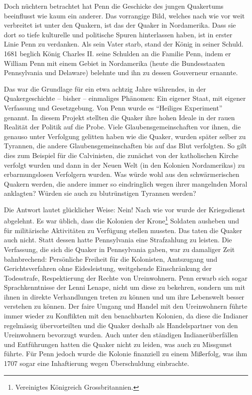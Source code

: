 \medskip

Doch nüchtern betrachtet hat Penn die Geschicke des jungen Quakertums
beeinflusst wie kaum ein anderer. Das vorrangige Bild, welches nach wie vor weit
verbreitet ist unter den Quakern, ist das der Quaker in Nordamerika. Dass sie
dort so tiefe kulturelle und politische Spuren hinterlassen haben, ist in erster
Linie Penn zu verdanken. Als sein Vater starb, stand der König in seiner Schuld.
1681 beglich König Charles II.  seine
Schulden an die Familie Penn, indem er William Penn mit einem
Gebiet in Nordamerika (heute die Bundesstaaten Pennsylvania und Delaware) belehnte und ihn
zu dessen Gouverneur ernannte.

\medskip

Das war die Grundlage für ein etwa achtzig Jahre währendes, in der Quakergeschichte
-- bisher -- einmaliges Phänomen: Ein eigener Staat, mit eigener Verfassung und
Gesetzgebung. Von Penn wurde es "`Heiliges Experiment"' genannt. In diesem Projekt
stellten die Quaker ihre hohen Ideale in der rauen Realität der Politik auf die
Probe. Viele Glaubensgemeinschaften vor ihnen, die genauso unter Verfolgung
gelitten haben wie die Quaker, wurden später selber zu Tyrannen, die andere
Glaubensgemeinschaften bis auf das Blut verfolgten. So gilt dies zum Beispiel für die
Calvinisten, die zunächst von der katholischen
Kirche verfolgt wurden und dann in der Neuen Welt (in den Kolonien
Nordamerikas) zu erbarmungslosen Verfolgern wurden. Was würde wohl aus den
schwärmerischen Quakern werden, die andere immer so eindringlich wegen ihrer
mangelnden Moral anklagten? Würden sie auch zu blutrünstigen Tyrannen werden?

\medskip

Die Antwort lautet glücklicher Weise: Nein! Nach wie vor wurde der Kriegsdienst
abgelehnt. Es war üblich, dass die Kolonien der Krone\footnote{Vereinigtes
Königreich Grossbritannien.} Soldaten ausheben und für militärische
Aktivitäten zu Verfügung stellen mussten. Das taten die Quaker auch nicht. Statt
dessen hatte Pennsylvania eine Strafzahlung zu leisten. Die Verfassung, die sich
die Quaker in Pennsylvania gaben, war zu damaliger Zeit bahnbrechend: Persönliche
Freiheit für die Kolonisten, Amtszugang und Gerichtsverfahren ohne
Eidesleistung, weitgehende Einschränkung der Todesstrafe, Respektierung der Rechte von Ureinwohnern. Penn erwarb sich sogar Sprachkenntnisse der Lenni Lenape, nicht
um diese zu bekehren, sondern um mit ihnen in direkte Verhandlungen treten zu
können und um ihre Lebenswelt besser verstehen zu können. Der faire Umgang und
Handel mit den Ureinwohnern führte immer wieder zu Konflikten mit den
benachbarten Kolonien, da diese die Indianer regelmässig übervorteilten und
die Quaker deshalb als Handelspartner von den Ureinwohnern bevorzugt wurden.
Auch unter den ständigen Indianerüberfällen und Entführungen
hatten die Quaker nicht zu leiden, was auch zu Missgunst führte. Für Penn jedoch
wurde die Kolonie finanziell zu einem Mißerfolg, was ihm 1707 sogar eine
Inhaftierung wegen Überschuldung einbrachte.

